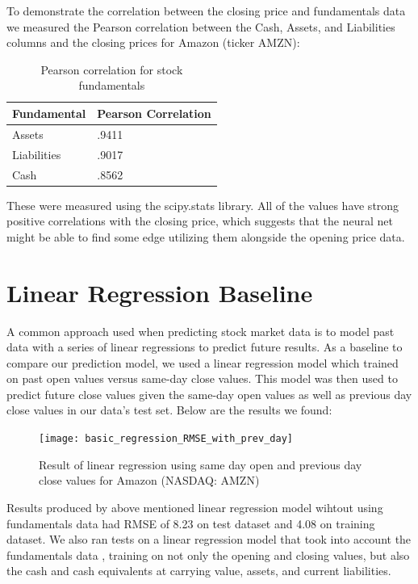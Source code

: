\documentclass{article}
\begin{document}
To demonstrate the correlation between the closing price and fundamentals data we measured the Pearson correlation between the Cash, Assets, and Liabilities columns and the closing prices for Amazon (ticker AMZN):
\begin{table}[H]
\centering
\begin{adjustbox}{width=0.3\textwidth}
\small
\begin{tabular}{|l|l|}
\hline
Fundamental & Pearson Correlation \\ \hline
Assets      & .9411               \\ \hline
Liabilities & .9017               \\ \hline
Cash        & .8562               \\ \hline
\end{tabular}
\end{adjustbox}
\caption{Pearson correlation for stock fundamentals}
\label{my-label}
\end{table}
These were measured using the scipy.stats library. All of the values have strong positive correlations with the closing price, which suggests that the neural net might be able to find some edge utilizing them alongside the opening price data. 

\section{Linear Regression Baseline}
\label{sec:linear_regression}
A common approach used when predicting stock market data is to model past data with a series of linear regressions to predict future results. As a baseline to compare our prediction model, we used a linear regression model which trained on past open values versus same-day close values. This model was then used to predict future close values given the same-day open values as well as previous day close values in our data’s test set. Below are the results we found:

\begin{figure}[H]
\centering
\texttt{[image: basic\_regression\_RMSE\_with\_prev\_day]}
\caption{Result of linear regression using same day open and previous day close values for Amazon (NASDAQ: AMZN)}
\label{fig:linear_withoutfunda}
\end{figure}

Results produced by above mentioned linear regression model wihtout using fundamentals data had RMSE of 8.23 on test dataset and 4.08 on training dataset. We also ran tests on a linear regression model that took into account the fundamentals data , training on not only the opening and closing values, but also the cash and cash equivalents at carrying value, assets, and current liabilities. 
\end{document}
